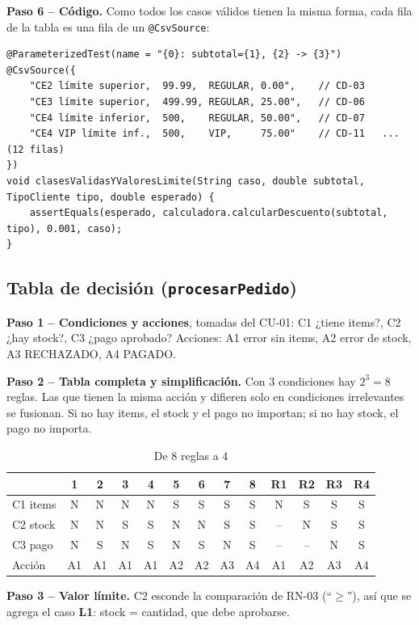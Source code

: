 \documentclass[11pt,a4paper,oneside]{report}
\newcommand{\code}[1]{\texttt{#1}}
\begin{document}
\textbf{Paso 6 -- Código.} Como todos los casos válidos tienen la misma forma, cada fila de la tabla es una fila de un \code{@CsvSource}:
\begin{lstlisting}[caption={Prueba parametrizada: una fila por caso}]
@ParameterizedTest(name = "{0}: subtotal={1}, {2} -> {3}")
@CsvSource({
    "CE2 límite superior,  99.99,  REGULAR, 0.00",    // CD-03
    "CE3 límite superior,  499.99, REGULAR, 25.00",   // CD-06
    "CE4 límite inferior,  500,    REGULAR, 50.00",   // CD-07
    "CE4 VIP límite inf.,  500,    VIP,     75.00"    // CD-11   ... (12 filas)
})
void clasesValidasYValoresLimite(String caso, double subtotal, TipoCliente tipo, double esperado) {
    assertEquals(esperado, calculadora.calcularDescuento(subtotal, tipo), 0.001, caso);
}
\end{lstlisting}

\subsection{Tabla de decisión (\code{procesarPedido})}
\textbf{Paso 1 -- Condiciones y acciones}, tomadas del CU-01: C1 ¿tiene items?, C2 ¿hay stock?, C3 ¿pago aprobado? Acciones: A1 error sin items, A2 error de stock, A3 RECHAZADO, A4 PAGADO.

\textbf{Paso 2 -- Tabla completa y simplificación.} Con 3 condiciones hay $2^3 = 8$ reglas. Las que tienen la misma acción y difieren solo en condiciones irrelevantes se fusionan. Si no hay items, el stock y el pago no importan; si no hay stock, el pago no importa.

\begin{table}[H]
\centering
\caption{De 8 reglas a 4}
\small
\begin{tabular}{lcccccccc|cccc}
\toprule
& 1 & 2 & 3 & 4 & 5 & 6 & 7 & 8 & \textbf{R1} & \textbf{R2} & \textbf{R3} & \textbf{R4}\\
\midrule
C1 items & N & N & N & N & S & S & S & S & N & S & S & S\\
C2 stock & N & N & S & S & N & N & S & S & -- & N & S & S\\
C3 pago & N & S & N & S & N & S & N & S & -- & -- & N & S\\
\midrule
Acción & A1 & A1 & A1 & A1 & A2 & A2 & A3 & A4 & A1 & A2 & A3 & A4\\
\bottomrule
\end{tabular}
\end{table}

\textbf{Paso 3 -- Valor límite.} C2 esconde la comparación de RN-03 (``$\geq$''), así que se agrega el caso \textbf{L1}: stock = cantidad, que debe aprobarse.
\end{document}
